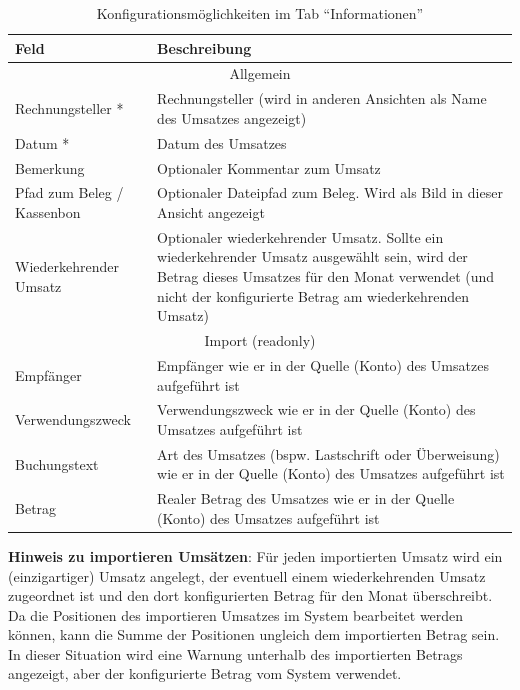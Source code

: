 \renewcommand{\arraystretch}{1.5}
\begin{table}[!ht]
\centering
\begin{tabular}{|p{6cm}|p{8cm}|}
\hline 
\textbf{Feld} & \textbf{Beschreibung} \\ 
\hline 
\hline 
\multicolumn{2}{|c|}{Allgemein} \\ 
\hline 
Rechnungsteller * & Rechnungsteller (wird in anderen Ansichten als Name des Umsatzes angezeigt)  \\ 
\hline 
Datum * & Datum des Umsatzes \\ 
\hline 
Bemerkung & Optionaler Kommentar zum Umsatz \\ 
\hline 
Pfad zum Beleg / Kassenbon & Optionaler Dateipfad zum Beleg. Wird als Bild in dieser Ansicht angezeigt \\ 
\hline 
Wiederkehrender Umsatz & Optionaler wiederkehrender Umsatz. Sollte ein wiederkehrender Umsatz ausgewählt sein, wird der Betrag dieses Umsatzes für den Monat verwendet (und nicht der konfigurierte Betrag am wiederkehrenden Umsatz) \\ 
\hline 
\hline 
\multicolumn{2}{|c|}{Import (readonly)} \\ 
\hline 
Empfänger & Empfänger wie er in der Quelle (Konto) des Umsatzes aufgeführt ist \\
\hline
Verwendungszweck & Verwendungszweck wie er in der Quelle (Konto) des Umsatzes aufgeführt ist \\
\hline 
Buchungstext & Art des Umsatzes (bspw. Lastschrift oder Überweisung) wie er in der Quelle (Konto) des Umsatzes aufgeführt ist \\
\hline 
Betrag & Realer Betrag des Umsatzes wie er in der Quelle (Konto) des Umsatzes aufgeführt ist \\
\hline 
\end{tabular} 
\caption{Konfigurationsmöglichkeiten im Tab "`Informationen"'}
\label{tab:uniqueTurnoverInfoTab}
\end{table}
\renewcommand{\arraystretch}{1.0}

\begin{infobox}
\textbf{Hinweis zu importieren Umsätzen}: Für jeden importierten Umsatz wird ein (einzigartiger) Umsatz angelegt, der eventuell einem wiederkehrenden Umsatz zugeordnet ist und den dort konfigurierten Betrag für den Monat überschreibt. Da die Positionen des importieren Umsatzes im System bearbeitet werden können, kann die Summe der Positionen ungleich dem importierten Betrag sein. In dieser Situation wird eine Warnung unterhalb des importierten Betrags angezeigt, aber der konfigurierte Betrag vom System verwendet. 
\end{infobox}

